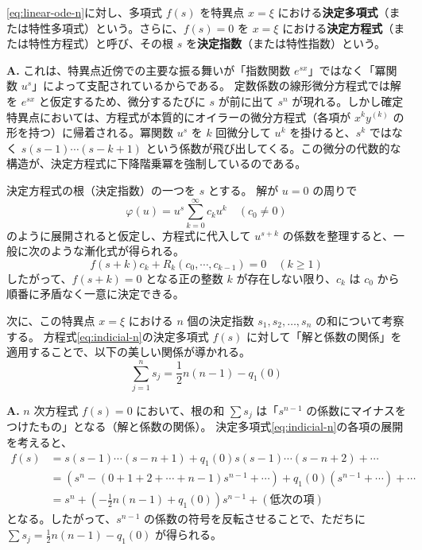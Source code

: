 \begin{definition}
\eqref{eq:linear-ode-n}に対し、多項式 $f(s)$ を特異点 $x=\xi$ における\textbf{決定多項式}（または特性多項式）という。さらに、$f(s)=0$ を $x=\xi$ における\textbf{決定方程式}（または特性方程式）と呼び、その根 $s$ を\textbf{決定指数}（または特性指数）という。
\end{definition}

\begin{Q}[【核心】決定方程式 $f(s)=0$ の各項が、$s^{n}$ のような単純な冪乗ではなく、$s(s-1)\cdots(s-n+1)$ のような「下降階乗冪（Falling factorial）」の形をとるのはなぜか？]
\textbf{A.} これは、特異点近傍での主要な振る舞いが「指数関数 $e^{sx}$」ではなく「冪関数 $u^{s}$」によって支配されているからである。
定数係数の線形微分方程式では解を $e^{sx}$ と仮定するため、微分するたびに $s$ が前に出て $s^{n}$ が現れる。しかし確定特異点においては、方程式が本質的にオイラーの微分方程式（各項が $x^{k} y^{(k)}$ の形を持つ）に帰着される。冪関数 $u^{s}$ を $k$ 回微分して $u^{k}$ を掛けると、$s^{k}$ ではなく $s(s-1)\cdots(s-k+1)$ という係数が飛び出してくる。この微分の代数的な構造が、決定方程式に下降階乗冪を強制しているのである。
\end{Q}

決定方程式の根（決定指数）の一つを $s$ とする。
解が $u=0$ の周りで
\[
\varphi(u) = u^{s}\sum_{k=0}^{\infty} c_{k}u^{k} \quad (c_{0}\neq 0)
\]
のように展開されると仮定し、方程式に代入して $u^{s+k}$ の係数を整理すると、一般に次のような漸化式が得られる。
\begin{equation}\label{eq:recurrence-n}
f(s+k)c_{k} + R_{k}(c_{0}, \cdots, c_{k-1}) = 0 \quad (k \ge 1)
\end{equation}
したがって、$f(s+k) = 0$ となる正の整数 $k$ が存在しない限り、$c_{k}$ は $c_{0}$ から順番に矛盾なく一意に決定できる。

次に、この特異点 $x=\xi$ における $n$ 個の決定指数 $s_{1}, s_{2}, \dots, s_{n}$ の和について考察する。
方程式\eqref{eq:indicial-n}の決定多項式 $f(s)$ に対して「解と係数の関係」を適用することで、以下の美しい関係が導かれる。
\begin{equation}\label{eq:sum-of-exponents}
\sum_{j=1}^{n} s_{j} = \frac{1}{2}n(n-1) - q_{1}(0)
\end{equation}

\begin{Q}
\textbf{A.} $n$ 次方程式 $f(s)=0$ において、根の和 $\sum s_{j}$ は「$s^{n-1}$ の係数にマイナスをつけたもの」となる（解と係数の関係）。
決定多項式\eqref{eq:indicial-n}の各項の展開を考えると、
\begin{align*}
f(s) &= s(s-1)\cdots(s-n+1) + q_{1}(0)s(s-1)\cdots(s-n+2) + \cdots \\
&= \left( s^{n} - (0+1+2+\cdots+n-1)s^{n-1} + \cdots \right) + q_{1}(0)\left( s^{n-1} + \cdots \right) + \cdots \\
&= s^{n} + \left( -\frac{1}{2}n(n-1) + q_{1}(0) \right)s^{n-1} + (\text{低次の項})
\end{align*}
となる。したがって、$s^{n-1}$ の係数の符号を反転させることで、ただちに $\sum s_{j} = \frac{1}{2}n(n-1) - q_{1}(0)$ が得られる。
\end{Q}

